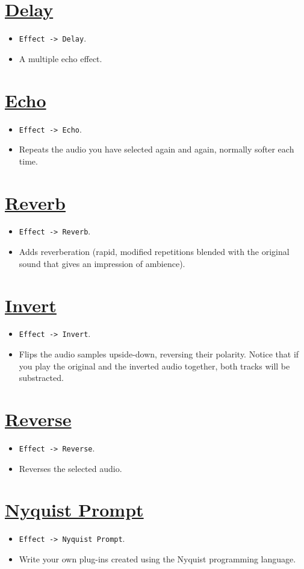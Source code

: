 \section{\href{http://manual.audacityteam.org/o/man/delay.html}{Delay}}
\begin{itemize}
\item \verb|Effect -> Delay|.
\item A multiple echo effect.
\end{itemize}

\section{\href{http://manual.audacityteam.org/o/man/echo.html}{Echo}}
\begin{itemize}
\item \verb|Effect -> Echo|.
\item Repeats the audio you have selected again and again, normally softer each time.
\end{itemize}

\section{\href{http://manual.audacityteam.org/o/man/reverb.html}{Reverb}}
\begin{itemize}
\item \verb|Effect -> Reverb|.
\item Adds reverberation (rapid, modified repetitions blended with the
  original sound that gives an impression of ambience).
\end{itemize}

\section{\href{http://manual.audacityteam.org/o/man/invert.html}{Invert}}
\begin{itemize}
\item \verb|Effect -> Invert|.
\item Flips the audio samples upside-down, reversing their
  polarity. Notice that if you play the original and the inverted
  audio together, both tracks will be substracted.
\end{itemize}

\section{\href{http://manual.audacityteam.org/o/man/reverse.html}{Reverse}}
\begin{itemize}
\item \verb|Effect -> Reverse|.
\item Reverses the selected audio.
\end{itemize}

\section{\href{http://manual.audacityteam.org/o/man/nyquist_prompt.html}{Nyquist Prompt}}
\begin{itemize}
\item \verb|Effect -> Nyquist Prompt|.
\item Write your own plug-ins created using the Nyquist programming language.
\end{itemize}
